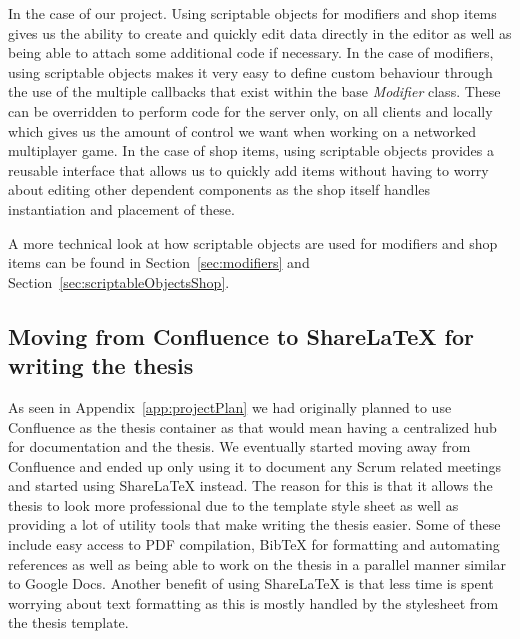 In the case of our project. Using scriptable objects for modifiers and shop items gives us the ability to create and quickly edit data directly in the editor as well as being able to attach some additional code if necessary. 
In the case of modifiers, using scriptable objects makes it very easy to define custom behaviour through the use of the multiple callbacks that exist within the base \emph{Modifier} class. These can be overridden to perform code for the server only, on all clients and locally which gives us the amount of control we want when working on a networked multiplayer game. 
In the case of shop items, using scriptable objects provides a reusable interface that allows us to quickly add items without having to worry about editing other dependent components as the shop itself handles instantiation and placement of these.  

A more technical look at how scriptable objects are used for modifiers and shop items can be found in Section~\ref{sec:modifiers} and Section~\ref{sec:scriptableObjectsShop}.
    
\subsection{Moving from Confluence to ShareLaTeX for writing the thesis}
As seen in Appendix~\ref{app:projectPlan} we had originally planned to use Confluence as the thesis container as that would mean having a centralized hub for documentation and the thesis. We eventually started moving away from Confluence and ended up only using it to document any Scrum related meetings and started using ShareLaTeX instead. The reason for this is that it allows the thesis to look more professional due to the template style sheet as well as providing a lot of utility tools that make writing the thesis easier. Some of these include easy access to PDF compilation, BibTeX for formatting and automating references as well as being able to work on the thesis in a parallel manner similar to Google Docs. Another benefit of using ShareLaTeX is that less time is spent worrying about text formatting as this is mostly handled by the stylesheet from the thesis template. 


